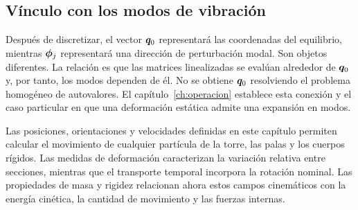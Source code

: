 \subsection{Vínculo con los modos de vibración}
Después de discretizar, el vector $\bm{q}_0$ representará las coordenadas del equilibrio, mientras $\bm{\phi}_j$ representará una dirección de perturbación modal. Son objetos diferentes. La relación es que las matrices linealizadas se evalúan alrededor de $\bm{q}_0$ y, por tanto, los modos dependen de él. No se obtiene $\bm{q}_0$ resolviendo el problema homogéneo de autovalores. El capítulo~\ref{ch:operacion} establece esta conexión y el caso particular en que una deformación estática admite una expansión en modos.

Las posiciones, orientaciones y velocidades definidas en este capítulo permiten calcular el movimiento de cualquier partícula de la torre, las palas y los cuerpos rígidos. Las medidas de deformación caracterizan la variación relativa entre secciones, mientras que el transporte temporal incorpora la rotación nominal. Las propiedades de masa y rigidez relacionan ahora estos campos cinemáticos con la energía cinética, la cantidad de movimiento y las fuerzas internas.

